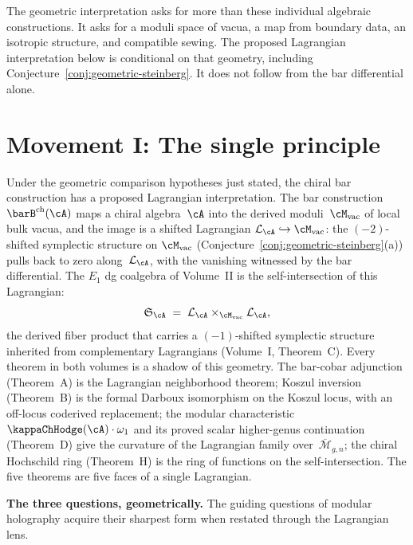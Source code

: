 
\bigskip

The geometric interpretation asks for more than these individual
algebraic constructions. It asks for a moduli space of vacua, a map from
boundary data, an isotropic structure, and compatible sewing. The proposed
Lagrangian interpretation below is conditional on that geometry,
including Conjecture~\ref{conj:geometric-steinberg}. It does not follow
from the bar differential alone.

\section*{Movement I\@: The single principle}

\providecommand{\cL}{\mathcal{L}}
\providecommand{\Mvac}{\cM_{\mathrm{vac}}}
\providecommand{\Mbar}{\overline{\mathcal M}}

Under the geometric comparison hypotheses just stated, the chiral bar
construction has a proposed Lagrangian interpretation.
The bar construction $\barB^{\mathrm{ch}}(\cA)$ maps a chiral
algebra~$\cA$ into the derived moduli~$\Mvac$ of local bulk vacua,
and the image is a shifted Lagrangian
$\cL_\cA \hookrightarrow \Mvac$: the $(-2)$-shifted symplectic
structure on $\Mvac$
(Conjecture~\ref{conj:geometric-steinberg}(a)) pulls back to zero
along~$\cL_\cA$, with the vanishing witnessed by the bar
differential. The $E_1$ dg coalgebra of Volume~II is the
self-intersection of this Lagrangian:
\[
 \mathfrak{S}_\cA
 \;=\;
 \cL_\cA \times_{\Mvac} \cL_\cA,
\]
the derived fiber product that carries a $(-1)$-shifted symplectic
structure inherited from complementary Lagrangians
(Volume~I, Theorem~C). Every theorem in both volumes is a shadow of
this geometry. The bar-cobar adjunction (Theorem~A) is the
Lagrangian neighborhood theorem; Koszul inversion (Theorem~B) is the
formal Darboux isomorphism on the Koszul locus, with an off-locus
coderived replacement; the modular characteristic
$\kappaChHodge(\cA) \cdot \omega_1$ and its proved scalar higher-genus
continuation (Theorem~D) give the curvature of the Lagrangian family
over~$\Mbar_{g,n}$; the chiral
Hochschild ring (Theorem~H) is the ring of functions on the
self-intersection. The five theorems are five faces of a single
Lagrangian.

\medskip

\noindent\textbf{The three questions, geometrically.}\enspace
The guiding questions of modular holography
acquire their sharpest form when restated through the Lagrangian lens.

